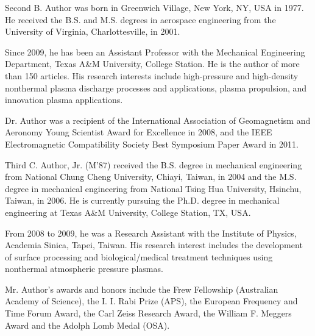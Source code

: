 \documentclass{ieeeojies}
\begin{document}
\begin{IEEEbiography}{Second B. Author} was born in Greenwich Village, New York, NY, USA in
1977. He received the B.S. and M.S. degrees in aerospace engineering from
the University of Virginia, Charlottesville, in 2001.

Since 2009, he has been an Assistant Professor with the
Mechanical Engineering Department, Texas A{\&}M University, College Station.
He is the author of more than 150 articles. His research interests include high-pressure and high-density nonthermal plasma discharge processes and applications, plasma propulsion, and innovation plasma applications.

Dr. Author was a recipient of the International Association of Geomagnetism
and Aeronomy Young Scientist Award for Excellence in 2008, and the IEEE
Electromagnetic Compatibility Society Best Symposium Paper Award in 2011.
\end{IEEEbiography}

\begin{IEEEbiography}{Third C. Author, Jr.} (M'87) received the B.S. degree in mechanical
engineering from National Chung Cheng University, Chiayi, Taiwan, in 2004
and the M.S. degree in mechanical engineering from National Tsing Hua
University, Hsinchu, Taiwan, in 2006. He is currently pursuing the Ph.D.
degree in mechanical engineering at Texas A{\&}M University, College
Station, TX, USA.

From 2008 to 2009, he was a Research Assistant with the Institute of
Physics, Academia Sinica, Tapei, Taiwan. His research interest includes the
development of surface processing and biological/medical treatment
techniques using nonthermal atmospheric pressure plasmas.

Mr. Author's awards and honors include the Frew Fellowship (Australian
Academy of Science), the I. I. Rabi Prize (APS), the European Frequency and
Time Forum Award, the Carl Zeiss Research Award, the William F. Meggers
Award and the Adolph Lomb Medal (OSA).
\end{IEEEbiography}

\EOD
\end{document}
